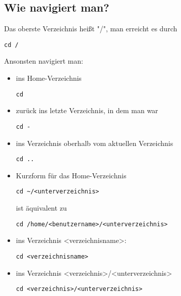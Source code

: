 \documentclass[a4paper,10pt]{article}
\begin{document}
\subsection{Wie navigiert man?}
Das oberste Verzeichnis heißt "/", man erreicht es durch 
\begin{lstlisting}
cd /
\end{lstlisting}	
Ansonsten navigiert man:
\begin{itemize}
\item ins Home-Verzeichnis
\begin{lstlisting}
cd
\end{lstlisting}
\item zurück ins letzte Verzeichnis, in dem man war 
\begin{lstlisting}
cd -
\end{lstlisting}
\item ins Verzeichnis oberhalb vom aktuellen Verzeichnis 
\begin{lstlisting}
cd ..
\end{lstlisting}
\item Kurzform für das Home-Verzeichnis 
\begin{lstlisting}
cd ~/<unterverzeichnis>
\end{lstlisting} 
ist äquivalent zu 
\begin{lstlisting}
cd /home/<benutzername>/<unterverzeichnis>
\end{lstlisting}
\item ins Verzeichnis <verzeichnisname>: 
\begin{lstlisting}
cd <verzeichnisname>
\end{lstlisting}
\item ins Verzeichnis <verzeichnis>/<unterverzeichnis> 
\begin{lstlisting}
cd <verzeichnis>/<unterverzeichnis>
\end{lstlisting}
\end{itemize}
\end{document}
